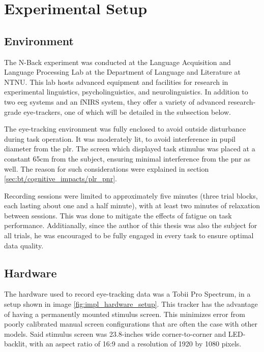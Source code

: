 \section{Experimental Setup}

\subsection{Environment}

The N-Back experiment was conducted at the Language Acquisition and Language Processing Lab at the Department of Language and Literature at NTNU. This lab hosts advanced equipment and facilities for research in experimental linguistics, psycholinguistics, and neurolinguistics. In addition to two \acrshort{eeg} systems and an fNIRS system, they offer a variety of advanced research-grade eye-trackers, one of which will be detailed in the subsection below. 

The eye-tracking environment was fully enclosed to avoid outside disturbance during task operation. It was moderately lit, to avoid interference in pupil diameter from the \acrshort{plr}. The screen which displayed task stimulus was placed at a constant 65cm from the subject, ensuring minimal interference from the \acrshort{pnr} as well. The reason for such considerations were explained in section \ref{sec:bt/cognitive_impacts/plr_pnr}. 

Recording sessions were limited to approximately five minutes (three trial blocks, each lasting about one and a half minute), with at least two minutes of relaxation between sessions. This was done to mitigate the effects of fatigue on task performance. Additianally, since the author of this thesis was also the subject for all trials, he was encouraged to be fully engaged in every task to ensure optimal data quality.

\subsection{Hardware}

The hardware used to record eye-tracking data was a Tobii Pro Spectrum, in a setup shown in image \ref{fig:impl_hardware_setup}. This tracker has the advantage of having a permanently mounted stimulus screen. This minimizes error from poorly calibrated manual screen configurations that are often the case with other models. Said stimulus screen was 23.8-inches wide corner-to-corner and LED-backlit, with an aspect ratio of 16:9 and a resolution of 1920 by 1080 pixels.

